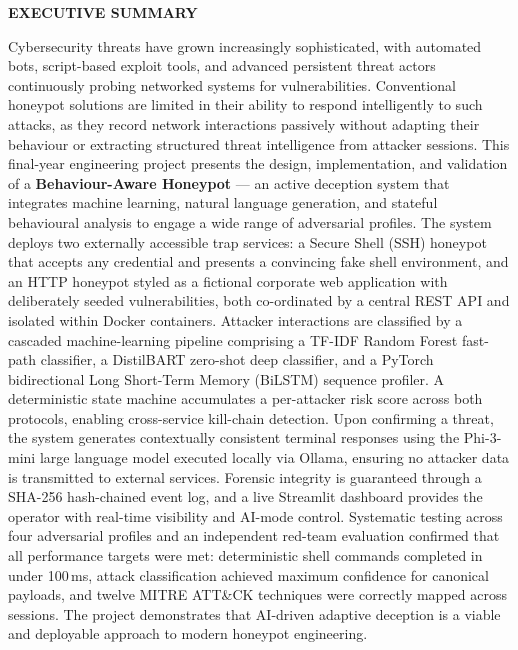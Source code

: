 \begin{center}
	\Large{\textbf{EXECUTIVE SUMMARY}}
\end{center}
\vspace{1em}
\normalsize

\hspace{1cm} Cybersecurity threats have grown increasingly sophisticated, with automated bots, script-based exploit tools, and advanced persistent threat actors continuously probing networked systems for vulnerabilities. Conventional honeypot solutions are limited in their ability to respond intelligently to such attacks, as they record network interactions passively without adapting their behaviour or extracting structured threat intelligence from attacker sessions. This final-year engineering project presents the design, implementation, and validation of a \textbf{Behaviour-Aware Honeypot} — an active deception system that integrates machine learning, natural language generation, and stateful behavioural analysis to engage a wide range of adversarial profiles. The system deploys two externally accessible trap services: a Secure Shell (SSH) honeypot that accepts any credential and presents a convincing fake shell environment, and an HTTP honeypot styled as a fictional corporate web application with deliberately seeded vulnerabilities, both co-ordinated by a central REST API and isolated within Docker containers. Attacker interactions are classified by a cascaded machine-learning pipeline comprising a TF-IDF Random Forest fast-path classifier, a DistilBART zero-shot deep classifier, and a PyTorch bidirectional Long Short-Term Memory (BiLSTM) sequence profiler. A deterministic state machine accumulates a per-attacker risk score across both protocols, enabling cross-service kill-chain detection. Upon confirming a threat, the system generates contextually consistent terminal responses using the Phi-3-mini large language model executed locally via Ollama, ensuring no attacker data is transmitted to external services. Forensic integrity is guaranteed through a SHA-256 hash-chained event log, and a live Streamlit dashboard provides the operator with real-time visibility and AI-mode control. Systematic testing across four adversarial profiles and an independent red-team evaluation confirmed that all performance targets were met: deterministic shell commands completed in under 100\,ms, attack classification achieved maximum confidence for canonical payloads, and twelve MITRE ATT\&CK techniques were correctly mapped across sessions. The project demonstrates that AI-driven adaptive deception is a viable and deployable approach to modern honeypot engineering.
